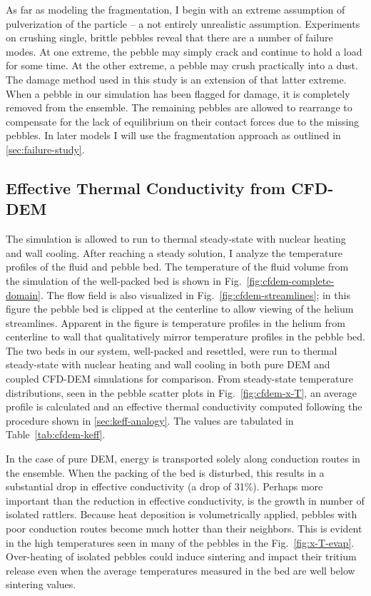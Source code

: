 As far as modeling the fragmentation, I begin with an extreme assumption of pulverization of the particle -- a not entirely unrealistic assumption. Experiments on crushing single, brittle pebbles reveal that there are a number of failure modes.\cite{Wu2004} At one extreme, the pebble may simply crack and continue to hold a load for some time. At the other extreme, a pebble may crush practically into a dust. The damage method used in this study is an extension of that latter extreme. When a pebble in our simulation has been flagged for damage, it is completely removed from the ensemble. The remaining pebbles are allowed to rearrange to compensate for the lack of equilibrium on their contact forces due to the missing pebbles. In later models I will use the fragmentation approach as outlined in \cref{sec:failure-study}.


\subsection{Effective Thermal Conductivity from CFD-DEM}\label{sec:cfd-dem-effective-conductivity}

The simulation is allowed to run to thermal steady-state with nuclear heating and wall cooling. After reaching a steady solution, I analyze the temperature profiles of the fluid and pebble bed. The temperature of the fluid volume from the simulation of the well-packed bed is shown in Fig.~\ref{fig:cfdem-complete-domain}. The flow field is also visualized in Fig.~\ref{fig:cfdem-streamlines}; in this figure the pebble bed is clipped at the centerline to allow viewing of the helium streamlines. Apparent in the figure is temperature profiles in the helium from centerline to wall that qualitatively mirror temperature profiles in the pebble bed. The two beds in our system, well-packed and resettled, were run to thermal steady-state with nuclear heating and wall cooling in both pure DEM and coupled CFD-DEM simulations for comparison. From steady-state temperature distributions, seen in the pebble scatter plots in Fig.~\ref{fig:cfdem-x-T}, an average profile is calculated and an effective thermal conductivity computed following the procedure shown in \cref{sec:keff-analogy}. The values are tabulated in Table~\ref{tab:cfdem-keff}. 

In the case of pure DEM, energy is transported solely along conduction routes in the ensemble. When the packing of the bed is disturbed, this results in a substantial drop in effective conductivity (a drop of 31\%). Perhaps more important than the reduction in effective conductivity, is the growth in number of isolated rattlers. Because heat deposition is volumetrically applied, pebbles with poor conduction routes become much hotter than their neighbors. This is evident in the high temperatures seen in many of the pebbles in the Fig.~\ref{fig:x-T-evap}. Over-heating of isolated pebbles could induce sintering and impact their tritium release even when the average temperatures measured in the bed are well below sintering values.

